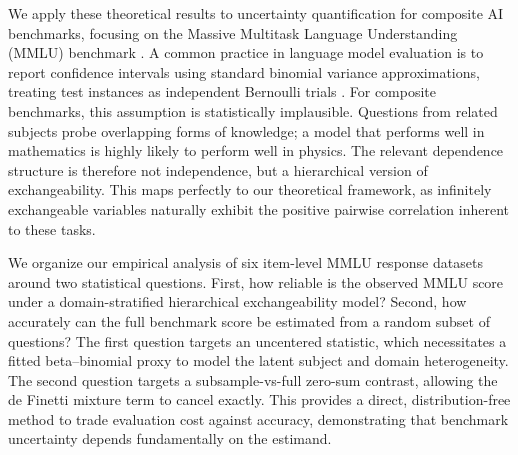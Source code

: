 \documentclass[11pt]{article}
\newcommand{\E}{\mathbb{E}}
\newcommand{\Pbb}{\mathbb{P}}
\theoremstyle{definition}
\theoremstyle{remark}
\begin{document}
We apply these theoretical results to uncertainty quantification for composite AI benchmarks, focusing on the Massive Multitask Language Understanding (MMLU) benchmark \citep{hendrycks2020measuring}. A common practice in language model evaluation is to report confidence intervals using standard binomial variance approximations, treating test instances as independent Bernoulli trials \citep{madaan2024quantifying}. For composite benchmarks, this assumption is statistically implausible. Questions from related subjects probe overlapping forms of knowledge; a model that performs well in mathematics is highly likely to perform well in physics. The relevant dependence structure is therefore not independence, but a hierarchical version of exchangeability. This maps perfectly to our theoretical framework, as infinitely exchangeable variables naturally exhibit the positive pairwise correlation inherent to these tasks.


We organize our empirical analysis of six item-level MMLU response datasets around two statistical questions. First, how reliable is the observed MMLU score under a domain-stratified hierarchical exchangeability model? Second, how accurately can the full benchmark score be estimated from a random subset of questions? The first question targets an uncentered statistic, which necessitates a fitted beta--binomial proxy to model the latent subject and domain heterogeneity. The second question targets a subsample-vs-full zero-sum contrast, allowing the de Finetti mixture term to cancel exactly. This provides a direct, distribution-free method to trade evaluation cost against accuracy, demonstrating that benchmark uncertainty depends fundamentally on the estimand.




\end{document}

